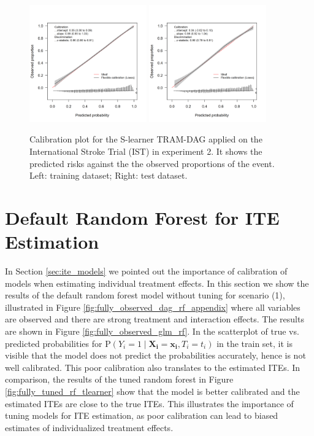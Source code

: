 \begin{figure}[htbp]
\centering
\includegraphics[width=0.45\textwidth]{img/results_IST/IST_TRAM_DAG_slearner_train_calibration_plot.png}
\includegraphics[width=0.45\textwidth]{img/results_IST/IST_TRAM_DAG_slearner_test_calibration_plot.png}
\caption{Calibration plot for the S-learner TRAM-DAG applied on the International Stroke Trial (IST) in experiment 2. It shows the predicted risks against the the observed proportions of the event. Left: training dataset; Right: test dataset.}
\label{fig:calibration_IST_TRAM_DAG}
\end{figure}




\section{Default Random Forest for ITE Estimation} \label{sec:default_rf_ite}

In Section \ref{sec:ite_models} we pointed out the importance of calibration of models when estimating individual treatment effects. In this section we show the results of the default random forest model without tuning for scenario (1), illustrated in Figure \ref{fig:fully_observed_dag_rf_appendix} where all variables are observed and there are strong treatment and interaction effects. The results are shown in Figure \ref{fig:fully_observed_glm_rf}. In the scatterplot of true vs. predicted probabilities for $\text{P}(Y_i = 1 \mid  \mathbf{X_i} = \mathbf{x_i}, T_i = t_i)$ in the train set, it is visible that the model does not predict the probabilities accurately, hence is not well calibrated. This poor calibration also translates to the estimated ITEs. In comparison, the results of the tuned random forest in Figure \ref{fig:fully_tuned_rf_tlearner} show that the model is better calibrated and the estimated ITEs are close to the true ITEs. This illustrates the importance of tuning models for ITE estimation, as poor calibration can lead to biased estimates of individualized treatment effects.


